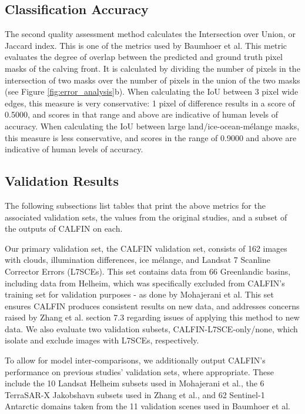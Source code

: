 \documentclass[tc, manuscript]{copernicus}
\begin{document}
\subsection{Classification Accuracy}\label{sec:classification}
The second quality assessment method calculates the Intersection over Union, or Jaccard index. This is one of the metrics used by Baumhoer et al. This metric evaluates the degree of overlap between the predicted and ground truth pixel masks of the calving front. It is calculated by dividing the number of pixels in the intersection of two masks over the number of pixels in the union of the two masks (see Figure \ref{fig:error_analysis}b). When calculating the IoU between 3 pixel wide edges, this measure is very conservative: 1 pixel of difference results in a score of 0.5000, and scores in that range and above are indicative of human levels of accuracy. When calculating the IoU between large land/ice-ocean-mélange masks, this measure is less conservative, and scores in the range of 0.9000 and above are indicative of human levels of accuracy.

\subsection{Validation Results}
\label{sec:validation_results}
The following subsections list tables that print the above metrics for the associated validation sets, the values from the original studies, and a subset of the outputs of CALFIN on each.

Our primary validation set, the CALFIN validation set, consists of 162 images with clouds, illumination differences, ice mélange, and Landsat 7 Scanline Corrector Errors (L7SCEs). This set contains data from 66 Greenlandic basins, including data from Helheim, which was specifically excluded from CALFIN's training set for validation purposes - as done by Mohajerani et al. This set ensures CALFIN produces consistent results on new data, and addresses concerns raised by Zhang et al. section 7.3 regarding issues of applying this method to new data. We also evaluate two validation subsets, CALFIN-L7SCE-only/none, which isolate and exclude images with L7SCEs, respectively.

To allow for model inter-comparisons, we additionally output CALFIN's performance on previous studies' validation sets, where appropriate. These include the 10 Landsat Helheim subsets used in Mohajerani et al., the 6 TerraSAR-X Jakobshavn subsets used in Zhang et al., and 62 Sentinel-1 Antarctic domains taken from the 11 validation scenes used in Baumhoer et al.
\end{document}
